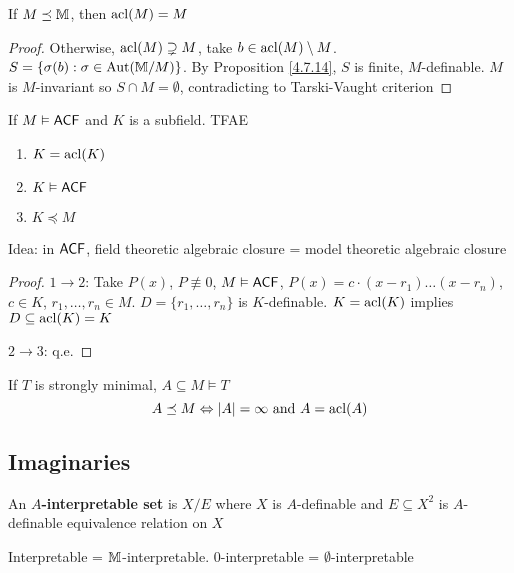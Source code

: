 \documentclass[11pt]{article}
\begin{document}
\begin{proposition}[]
If \(M\preceq\mathbb{M}\), then \(\operatorname{acl}(M)=M\)
\end{proposition}

\begin{proof}
Otherwise, \(\operatorname{acl}(M)\supsetneq M\), take \(b\in\operatorname{acl}(M)\setminus M\). \(S=\{\sigma(b):\sigma\in\operatorname{\text{Aut}}(\mathbb{M}/M)\}\). By
Proposition \ref{4.7.14}, \(S\) is finite, \(M\)-definable. \(M\) is \(M\)-invariant
so \(S\cap M=\emptyset\), contradicting to Tarski-Vaught criterion
\end{proof}

\begin{proposition}[]
If \(M\vDash\textsf{ACF}\) and \(K\) is a subfield. TFAE
\begin{enumerate}
\item \(K=\operatorname{acl}(K)\)
\item \(K\vDash\textsf{ACF}\)
\item \(K\preceq M\)
\end{enumerate}
\end{proposition}

Idea: in \(\textsf{ACF}\), field theoretic algebraic closure = model theoretic algebraic closure

\begin{proof}
\(1\to 2\):
Take \(P(x)\),
\(P\not\equiv 0\), \(M\vDash\textsf{ACF}\), \(P(x)=c\cdot(x-r_1)\dots(x-r_n)\), \(c\in K\), \(r_1,\dots,r_n\in M\). \(D=\{r_1,\dots,r_n\}\)
is \(K\)-definable. \(K=\operatorname{acl}(K)\) implies \(D\subseteq\operatorname{acl}(K)=K\)

\(2\to 3\): q.e.
\end{proof}

\begin{fact}[]
If \(T\) is strongly minimal, \(A\subseteq M\vDash T\)
\begin{equation*}
A\preceq M\Leftrightarrow\abs{A}=\infty\text{ and }A=\acl(A)
\end{equation*}
\end{fact}


\subsection{Imaginaries}
\label{sec:org5488e0c}
\begin{definition}[]
An \textbf{\(A\)-interpretable set} is \(X/E\) where \(X\) is \(A\)-definable and \(E\subseteq X^2\)
is \(A\)-definable equivalence relation on \(X\)
\end{definition}

Interpretable = \(\mathbb{M}\)-interpretable. 0-interpretable = \(\emptyset\)-interpretable
\end{document}
